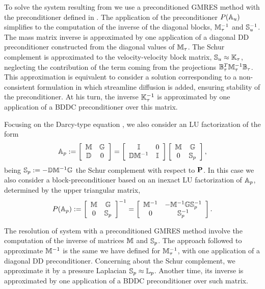 To solve the system resulting from  we use a preconditioned GMRES method with the preconditioner defined in . The application of the preconditioner $ P(\A_u) $ simplifies to the computation of the inverse of the diagonal blocks, $ \M_\tau^{-1} $ and $ \Sb_u^{-1} $. The mass matrix inverse is approximated by one application of a diagonal DD preconditioner constructed from the diagonal values of $ \M_\tau $. The Schur complement is approximated to the velocity-velocity block matrix, $ \Sb_u\approx\K_\tau $, neglecting the contribution of the term coming from the projections $ \B_\tau^T\M_\tau^{-1}\B_\tau $. This approximation is equivalent to consider a solution corresponding to a non-consistent formulation in which streamline diffusion is added, ensuring stability of the preconditioner. At his turn, the inverse $ \K_\tau^{-1} $ is approximated by one application of a BDDC preconditioner over this matrix.

Focusing on the Darcy-type equation , we also consider an LU factorization of the form
\begin{equation}
\label{SRK_p_mat}
\A_p:=\left[\begin{array}{cc}
\M&\G\\
\D&0
\end{array}\right]=\left[\begin{array}{cc}
\I&0\\
\D\M^{-1}&\I
\end{array}\right]\left[\begin{array}{cc}
\M&\G\\
0&\Sb_p
\end{array}\right],
\end{equation}
being $ \Sb_p:=-\D\M^{-1}\G$ the Schur complement with respect to $\P$. In this case we also consider a block-preconditioner based on an inexact LU factorization of $ \A_p $, determined by the upper triangular matrix,
\begin{equation}
\label{SRK_p_prec}
P(\A_p):=\left[\begin{array}{cc}
\M&\G\\
0&\Sb_p
\end{array}\right]^{-1}=\left[\begin{array}{cc}
\M^{-1}&-\M^{-1}\G\Sb_p^{-1}\\
0&\Sb_p^{-1}
\end{array}\right].
\end{equation}

The resolution of system  with a preconditioned GMRES method involve the computation of the inverse of matrices $ \M $ and $ \Sb_p $. The approach followed to approximate $ \M^{-1} $ is the same we have defined for $ \M_\tau^{-1} $, with one application of a diagonal DD preconditioner. Concerning about the Schur complement, we approximate it by a pressure Laplacian $ \Sb_p\approx\L_p $. Another time, its inverse is approximated by one application of a BDDC preconditioner over such matrix.

